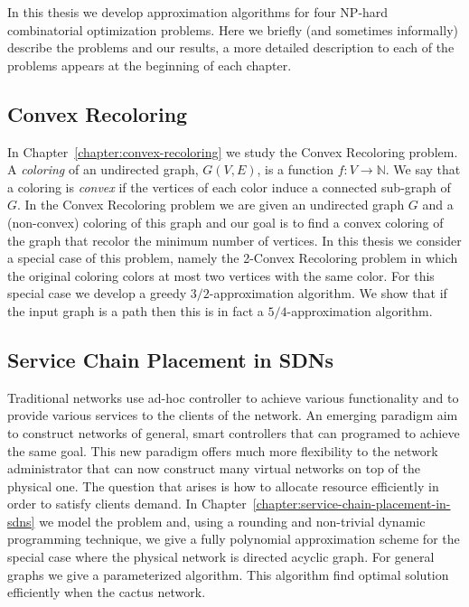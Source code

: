 In this thesis we develop approximation algorithms for four NP-hard combinatorial optimization problems.
Here we briefly (and sometimes informally) describe the problems and our results, a more detailed description to each of the problems appears at the beginning of each chapter.

\subsection*{Convex Recoloring} 
In Chapter~\ref{chapter:convex-recoloring} we study the Convex Recoloring problem.
A \emph{coloring} of an undirected graph, $G(V, E)$, is a function $f:V \to \mathbb{N}$.
We say that a coloring is \emph{convex} if the vertices of each color induce a connected sub-graph of $G$.
In the Convex Recoloring problem we are given an undirected graph $G$ and a (non-convex) coloring of this graph and our goal is to find a convex coloring of the graph that recolor the minimum number of vertices.
In this thesis we consider a special case of this problem, namely the 2-Convex Recoloring problem in which the original coloring colors at most two vertices with the same color.
For this special case we develop a greedy $3/2$-approximation algorithm.
We show that if the input graph is a path then this is in fact a $5/4$-approximation algorithm.


\subsection*{Service Chain Placement in SDNs} 
Traditional networks use ad-hoc controller to achieve various functionality and to provide various services to the clients of the network.
An emerging paradigm aim to construct networks of general, smart controllers that can programed to achieve the same goal. 
This new paradigm offers much more flexibility to the network administrator that can now construct many virtual networks on top of the physical one.
The question that arises is how to allocate resource efficiently in order to satisfy clients demand.
In Chapter~\ref{chapter:service-chain-placement-in-sdns} we model the problem and, using a rounding and non-trivial dynamic programming technique, we give a fully polynomial approximation scheme for the special case where the physical network is directed acyclic graph. 
For general graphs we give a parameterized algorithm.
This algorithm find optimal solution efficiently when the cactus network.

